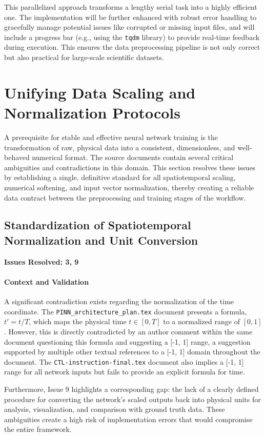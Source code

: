 \documentclass[11pt, a4paper]{article}
\begin{document}
This parallelized approach transforms a lengthy serial task into a highly efficient one. The implementation will be further enhanced with robust error handling to gracefully manage potential issues like corrupted or missing input files, and will include a progress bar (e.g., using the \texttt{tqdm} library) to provide real-time feedback during execution. This ensures the data preprocessing pipeline is not only correct but also practical for large-scale scientific datasets.

\section{Unifying Data Scaling and Normalization Protocols}
A prerequisite for stable and effective neural network training is the transformation of raw, physical data into a consistent, dimensionless, and well-behaved numerical format. The source documents contain several critical ambiguities and contradictions in this domain. This section resolves these issues by establishing a single, definitive standard for all spatiotemporal scaling, numerical softening, and input vector normalization, thereby creating a reliable data contract between the preprocessing and training stages of the workflow.

\subsection{Standardization of Spatiotemporal Normalization and Unit Conversion}
\textbf{Issues Resolved: 3, 9}
\paragraph{Context and Validation}
A significant contradiction exists regarding the normalization of the time coordinate. The \texttt{PINN\_architecture\_plan.tex} document presents a formula, $t' = t/T$, which maps the physical time $t \in [0, T]$ to a normalized range of $[0, 1]$. However, this is directly contradicted by an author comment within the same document questioning this formula and suggesting a [-1, 1] range, a suggestion supported by multiple other textual references to a [-1, 1] domain throughout the document. The \texttt{CTL-instruction-final.tex} document also implies a [-1, 1] range for all network inputs but fails to provide an explicit formula for time.

Furthermore, Issue 9 highlights a corresponding gap: the lack of a clearly defined procedure for converting the network's scaled outputs back into physical units for analysis, visualization, and comparison with ground truth data. These ambiguities create a high risk of implementation errors that would compromise the entire framework.
\end{document}
